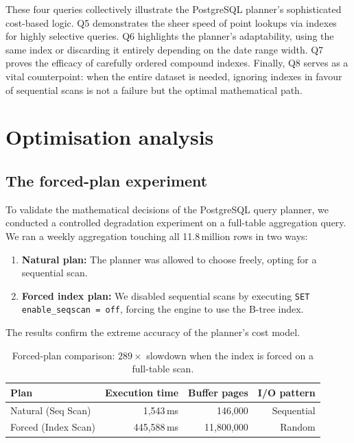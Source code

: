 \documentclass[a4paper,11pt]{article}
\begin{document}
These four queries collectively illustrate the PostgreSQL planner's sophisticated
cost-based logic. Q5 demonstrates the sheer speed of point lookups via indexes
for highly selective queries. Q6 highlights the planner's adaptability, using
the same index or discarding it entirely depending on the date range width.
Q7 proves the efficacy of carefully ordered compound indexes. Finally, Q8 serves
as a vital counterpoint: when the entire dataset is needed, ignoring indexes in
favour of sequential scans is not a failure but the optimal mathematical path.


\newpage
\section{Optimisation analysis}
\label{sec:optimisation}

\subsection{The forced-plan experiment}

To validate the mathematical decisions of the PostgreSQL query planner, we
conducted a controlled degradation experiment on a full-table aggregation query.
We ran a weekly aggregation touching all 11.8\,million rows in two ways:
\begin{enumerate}
  \item \textbf{Natural plan:} The planner was allowed to choose freely,
    opting for a sequential scan.
  \item \textbf{Forced index plan:} We disabled sequential scans by executing
    \texttt{SET enable\_seqscan = off}, forcing the engine to use the B-tree index.
\end{enumerate}
The results confirm the extreme accuracy of the planner's cost model.

\begin{table}[H]
\centering
\begin{tabular}{lrrr}
\toprule
\textbf{Plan} & \textbf{Execution time} & \textbf{Buffer pages} &
  \textbf{I/O pattern} \\
\midrule
Natural (Seq Scan)  & 1,543\,ms   & 146,000      & Sequential \\
Forced (Index Scan) & 445,588\,ms & 11,800,000   & Random \\
\bottomrule
\end{tabular}
\caption{Forced-plan comparison: $289\times$ slowdown when the index is forced on a full-table scan.}
\label{tab:forced-plan}
\end{table}
\end{document}
